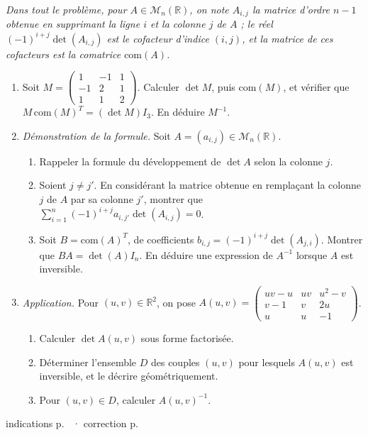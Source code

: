 \documentclass[a4paper,11pt]{article}
\numberwithin{equation}{section}
\numberwithin{figure}{section}
\numberwithin{table}{section}
\theoremstyle{enonce}
\theoremstyle{exemple}
\theoremstyle{remarque}
\newcommand{\R}{\mathbb{R}}
\begin{document}
\emph{Dans tout le problème, pour $A\in\mathcal M_n(\R)$, on note $A_{i,j}$ la matrice d'ordre $n-1$ obtenue en supprimant la ligne $i$ et la colonne $j$ de $A$ ; le réel $(-1)^{i+j}\det(A_{i,j})$ est le cofacteur d'indice $(i,j)$, et la matrice de ces cofacteurs est la \emph{comatrice} $\mathrm{com}(A)$.}
\begin{enumerate}
\item Soit $M=\begin{pmatrix}1&-1&1\\-1&2&1\\1&1&2\end{pmatrix}$. Calculer $\det M$, puis $\mathrm{com}(M)$, et vérifier que $M\,\mathrm{com}(M)^T=(\det M)I_3$. En déduire $M^{-1}$.
\item \emph{Démonstration de la formule.} Soit $A=(a_{i,j})\in\mathcal M_n(\R)$.
\begin{enumerate}
\item Rappeler la formule du développement de $\det A$ selon la colonne $j$.
\item Soient $j\neq j'$. En considérant la matrice obtenue en remplaçant la colonne $j$ de $A$ par sa colonne $j'$, montrer que $\sum_{i=1}^n(-1)^{i+j}a_{i,j'}\det(A_{i,j})=0$.
\item Soit $B=\mathrm{com}(A)^T$, de coefficients $b_{i,j}=(-1)^{i+j}\det(A_{j,i})$. Montrer que $BA=\det(A)I_n$. En déduire une expression de $A^{-1}$ lorsque $A$ est inversible.
\end{enumerate}
\item \emph{Application.} Pour $(u,v)\in\R^2$, on pose $A(u,v)=\begin{pmatrix}uv-u&uv&u^2-v\\v-1&v&2u\\u&u&-1\end{pmatrix}$.
\begin{enumerate}
\item Calculer $\det A(u,v)$ sous forme factorisée.
\item Déterminer l'ensemble $D$ des couples $(u,v)$ pour lesquels $A(u,v)$ est inversible, et le décrire géométriquement.
\item Pour $(u,v)\in D$, calculer $A(u,v)^{-1}$.
\end{enumerate}
\end{enumerate}
\par\vspace{0.8em}\noindent\hfill{\scriptsize\sffamily\color{Gris}indications p.~\pageref{i:sel-det-2019} · correction p.~\pageref{c:sel-det-2019}}
\end{document}
